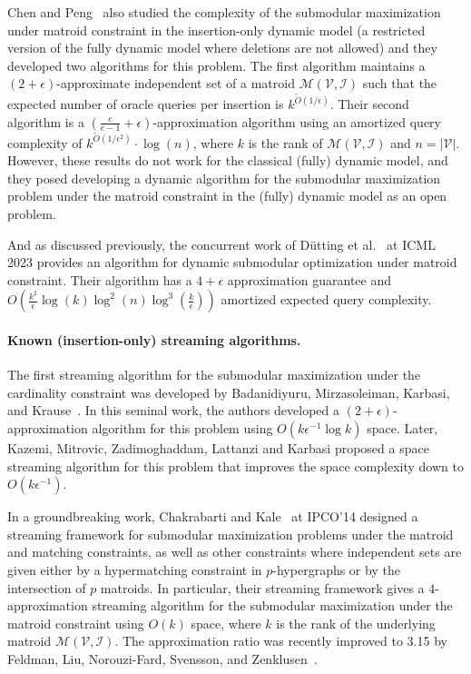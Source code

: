 \documentclass[11pt]{article}
\newcommand{\matroid}{\mathcal{M}(\ground,\mathcal{I})}
\newcommand{\ground}{\ensuremath{\mathcal{V}}}
\begin{document}
Chen and Peng~\cite{DBLP:journals/corr/abs-2111-03198} also
studied the complexity of the submodular maximization under matroid constraint in the insertion-only dynamic model (a restricted version of the fully dynamic model where deletions are not allowed) and they developed two algorithms for this problem.
The first algorithm maintains a $(2+\epsilon)$-approximate independent set of a matroid $\matroid$ such that the expected number of oracle queries per insertion is $k^{\tilde{O}(1/\epsilon)}$. Their second algorithm is a $(\frac{e}{e-1}+\epsilon)$-approximation algorithm 
using an amortized query complexity of $k^{\tilde{O}(1/\epsilon^2)}\cdot \log(n)$, where $k$ is the rank of $\matroid$ and $n = |\ground|$. 
However, these results do not work for the classical (fully) dynamic model, and they posed developing a dynamic algorithm for the submodular maximization problem under the matroid constraint in the (fully) dynamic model as an open problem. 

And as discussed previously, the concurrent work of 
Dütting et al.~\cite{dutting2023fully} at ICML 2023 provides an algorithm for dynamic submodular optimization under matroid constraint. Their algorithm has a 
$4+\epsilon$ approximation guarantee and $O(\frac{k^2}{\epsilon}\log(k)\log^2(n)\log^3(\frac{k}{\epsilon}))$ amortized expected query complexity.


\paragraph{Known (insertion-only) streaming algorithms.}
The first streaming algorithm for the submodular maximization under the cardinality constraint 
was developed by Badanidiyuru, Mirzasoleiman, Karbasi, and Krause~\cite{DBLP:conf/kdd/BadanidiyuruMKK14}. 
In this seminal work, the authors developed a $(2+\epsilon)$-approximation algorithm 
for this problem using $O(k\epsilon^{-1}\log k )$ space. 
Later, Kazemi, Mitrovic, Zadimoghaddam, Lattanzi and Karbasi \cite{DBLP:conf/icml/0001MZLK19} 
proposed a space streaming algorithm for this problem that improves the space complexity down to 
$O(k\epsilon^{-1})$. 


In a groundbreaking work, Chakrabarti and Kale~\cite{chakrabarti2015submodular} at IPCO'14 
designed a streaming framework for submodular maximization problems 
under the matroid and matching constraints, as well as other constraints where independent sets are given 
either by a hypermatching constraint in $p$-hypergraphs or by the intersection of $p$ matroids.  
In particular, their streaming framework gives a $4$-approximation streaming algorithm for the 
submodular maximization under the matroid constraint using $O(k)$  space, where $k$ is 
the rank of the underlying matroid $\matroid$. 
The approximation ratio was recently improved to 3.15
by Feldman, Liu, Norouzi-Fard, Svensson, and Zenklusen~\cite{feldman2021streaming}.
\end{document}
